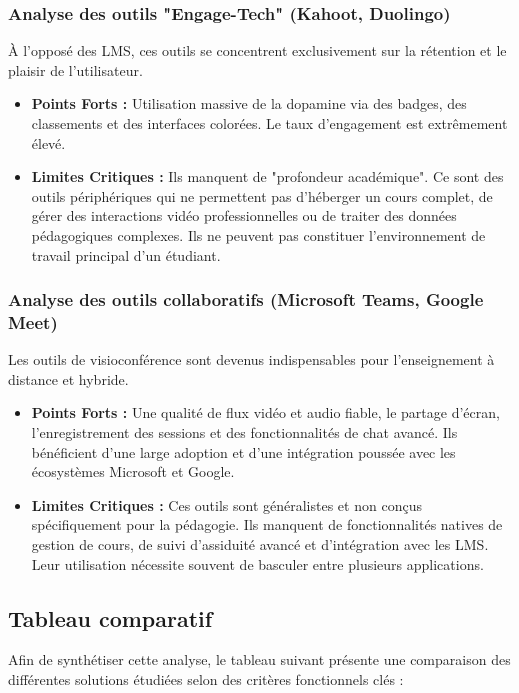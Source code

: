 \subsubsection{Analyse des outils "Engage-Tech" (Kahoot, Duolingo)}
À l'opposé des LMS, ces outils se concentrent exclusivement sur la rétention et le plaisir de l'utilisateur.
\begin{itemize}
\item \textbf{Points Forts :} Utilisation massive de la dopamine via des badges, des classements et des interfaces colorées. Le taux d'engagement est extrêmement élevé.
\item \textbf{Limites Critiques :} Ils manquent de "profondeur académique". Ce sont des outils périphériques qui ne permettent pas d'héberger un cours complet, de gérer des interactions vidéo professionnelles ou de traiter des données pédagogiques complexes. Ils ne peuvent pas constituer l'environnement de travail principal d'un étudiant.
\end{itemize}

\subsubsection{Analyse des outils collaboratifs (Microsoft Teams, Google Meet)}
Les outils de visioconférence sont devenus indispensables pour l'enseignement à distance et hybride.
\begin{itemize}
\item \textbf{Points Forts :} Une qualité de flux vidéo et audio fiable, le partage d'écran, l'enregistrement des sessions et des fonctionnalités de chat avancé. Ils bénéficient d'une large adoption et d'une intégration poussée avec les écosystèmes Microsoft et Google.
\item \textbf{Limites Critiques :} Ces outils sont généralistes et non conçus spécifiquement pour la pédagogie. Ils manquent de fonctionnalités natives de gestion de cours, de suivi d'assiduité avancé et d'intégration avec les LMS. Leur utilisation nécessite souvent de basculer entre plusieurs applications.
\end{itemize}

\subsection{Tableau comparatif}
Afin de synthétiser cette analyse, le tableau suivant présente une comparaison des différentes solutions étudiées selon des critères fonctionnels clés :

